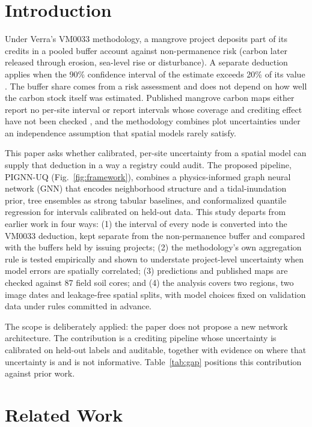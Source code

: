 \documentclass[conference]{IEEEtran}
\begin{document}
\section{Introduction}

Under Verra's VM0033 methodology, a mangrove project deposits part of its credits in a pooled buffer account against non-permanence risk (carbon later released through erosion, sea-level rise or disturbance).
A separate deduction applies when the 90\% confidence interval of the estimate exceeds 20\% of its value \cite[p.~64]{verra_vm0033}.
The buffer share comes from a risk assessment and does not depend on how well the carbon stock itself was estimated.
Published mangrove carbon maps either report no per-site interval or report intervals whose coverage and crediting effect have not been checked \cite{maxwell2023soc,radabaugh2023bluecarbon}, and the methodology combines plot uncertainties under an independence assumption that spatial models rarely satisfy.

This paper asks whether calibrated, per-site uncertainty from a spatial model can supply that deduction in a way a registry could audit.
The proposed pipeline, PIGNN-UQ (Fig.~\ref{fig:framework}), combines a physics-informed graph neural network (GNN) that encodes neighborhood structure and a tidal-inundation prior, tree ensembles as strong tabular baselines, and conformalized quantile regression for intervals calibrated on held-out data.
This study departs from earlier work in four ways: (1) the interval of every node is converted into the VM0033 deduction, kept separate from the non-permanence buffer and compared with the buffers held by issuing projects; (2) the methodology's own aggregation rule is tested empirically and shown to understate project-level uncertainty when model errors are spatially correlated; (3) predictions and published maps are checked against 87 field soil cores; and (4) the analysis covers two regions, two image dates and leakage-free spatial splits, with model choices fixed on validation data under rules committed in advance.

The scope is deliberately applied: the paper does not propose a new network architecture.
The contribution is a crediting pipeline whose uncertainty is calibrated on held-out labels and auditable, together with evidence on where that uncertainty is and is not informative.
Table~\ref{tab:gap} positions this contribution against prior work.

\section{Related Work}
\end{document}
